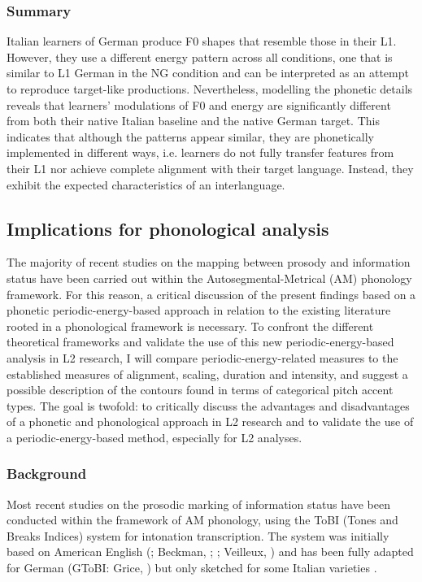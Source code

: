 \subsubsection{Summary}
\hypertarget{Toc191305915}{}
Italian learners of German produce F0 shapes that resemble those in their L1. However, they use a different energy pattern across all conditions, one that is similar to L1 German in the NG condition and can be interpreted as an attempt to reproduce target-like productions. Nevertheless, modelling the phonetic details reveals that learners’ modulations of F0 and energy are significantly different from both their native Italian baseline and the native German target. This indicates that although the patterns appear similar, they are phonetically implemented in different ways, i.e. learners do not fully transfer features from their L1 nor achieve complete alignment with their target language. Instead, they exhibit the expected characteristics of an interlanguage.

\subsection{Implications for phonological analysis}
\hypertarget{Toc191305916}{}
The majority of recent studies on the mapping between prosody and information status have been carried out within the Autosegmental-Metrical (AM) phonology framework. For this reason, a critical discussion of the present findings based on a phonetic periodic-energy-based approach in relation to the existing literature rooted in a phonological framework is necessary. To confront the different theoretical frameworks and validate the use of this new periodic-energy-based analysis in L2 research, I will compare periodic-energy-related measures to the established measures of alignment, scaling, duration and intensity, and suggest a possible description of the contours found in terms of categorical pitch accent types. The goal is twofold: to critically discuss the advantages and disadvantages of a phonetic and phonological approach in L2 research and to validate the use of a periodic-energy-based method, especially for L2 analyses.

\subsubsection{Background}
\hypertarget{Toc191305917}{}
Most recent studies on the prosodic marking of information status have been conducted within the framework of AM phonology, using the ToBI (Tones and Breaks Indices) system for intonation transcription. The system was initially based on American English (\citealt{BeckmanAyers1997}; Beckman, \citealt{HirschbergShattuck-Hufnagel2005}; \citealt{BeckmanPierrehumbert1986}; Veilleux, \citealt{Shattuck-HufnagelBrugos2006}) and has been fully adapted for German (GToBI: Grice, \citealt{BaumannBenzmüller2005}) but only sketched for some Italian varieties \citep{GriceEtAl2005}.

